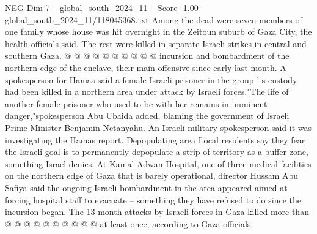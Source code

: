 \begin{textsample}{NEG Dim 7 – global\_south\_2024\_11 – Score -1.00 – global\_south\_2024\_11/118045368.txt}
Among the dead were seven members of one family whose house was hit overnight in the Zeitoun suburb of Gaza City, the health officials said.
The rest were killed in separate Israeli strikes in central and southern Gaza. @ @ @ @ @ @ @ @ @ @ incursion and bombardment of the northern edge of the enclave, their main offensive since early last month.
A spokesperson for Hamas said a female Israeli prisoner in the group ' s custody had been killed in a northern area under attack by Israeli forces."The life of another female prisoner who used to be with her remains in imminent danger,"spokesperson Abu Ubaida added, blaming the government of Israeli Prime Minister Benjamin Netanyahu.
An Israeli military spokesperson said it was investigating the Hamas report.
Depopulating area Local residents say they fear the Israeli goal is to permanently depopulate a strip of territory as a buffer zone, something Israel denies.
At Kamal Adwan Hospital, one of three medical facilities on the northern edge of Gaza that is barely operational, director Hussam Abu Safiya said the ongoing Israeli bombardment in the area appeared aimed at forcing hospital staff to evacuate -- something they have refused to do since the incursion began.
The 13-month attacks by Israeli forces in Gaza killed more than @ @ @ @ @ @ @ @ @ @ at least once, according to Gaza officials.

\end{textsample}
